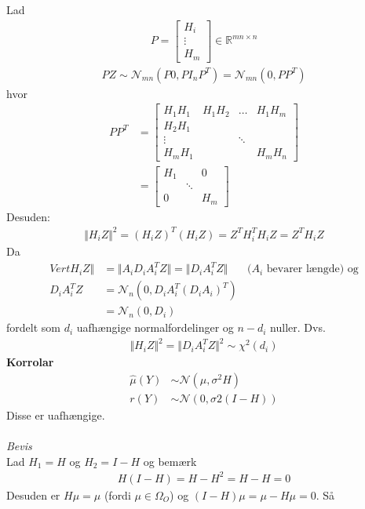 \documentclass[12pt,a4paper]{report}
\begin{document}
Lad
\begin{align*}
P=\begin{bmatrix}H_i\\ \vdots\\H_m\end{bmatrix}\in\mathbb{R}^{mn\times n}
\end{align*}
\begin{align*}
PZ\sim\mathcal{N}_{mn}(P0,PI_nP^T)=\mathcal{N}_{mn}(0,PP^T)
\end{align*}
hvor
\begin{align*}
PP^T&=\begin{bmatrix}H_1H_1&H_1H_2&\hdots&H_1H_m\\H_2H_1& & & \\
\vdots & &\ddots & \\
H_mH_1 & & &H_mH_n\end{bmatrix}\\
&=\begin{bmatrix}H_1& & 0\\&\ddots&\\0& & H_m\end{bmatrix}
\end{align*}
Desuden:
\begin{align*}
\Vert H_iZ\Vert^2=(H_iZ)^T(H_iZ)=Z^TH_i^TH_iZ=Z^TH_iZ
\end{align*}
Da
\begin{align*}
Vert H_iZ\Vert&=\Vert A_iD_iA_i^TZ\Vert=\Vert D_iA_i^TZ\Vert\phantom{mm}\text{($A_i$ bevarer længde) og}\\
D_iA_i^TZ&=\mathcal{N}_n(0,D_iA_i^T(D_iA_i)^T)\\
&=\mathcal{N}_n(0,D_i)
\end{align*}
fordelt som $d_i$ uafhængige normalfordelinger og $n-d_i$ nuller. Dvs.
\begin{align*}
\Vert H_iZ\Vert^2=\Vert D_iA_i^TZ\Vert^2\sim\chi^2(d_i)
\end{align*}
\textbf{Korrolar}
\begin{align*}
\hat{\mu}(Y)&\sim\mathcal{N}(\mu,\sigma^2H)\\
r(Y)&\sim\mathcal{N}(0,\sigma2(I-H))
\end{align*}
Disse er uafhængige.\\\\
\textit{Bevis}\\
Lad $H_1=H$ og $H_2=I-H$ og bemærk
\begin{align*}
H(I-H)=H-H^2=H-H=0
\end{align*}
Desuden er $H\mu=\mu$ (fordi $\mu\in\Omega_O$) og $(I-H)\mu=\mu-H\mu=0$. Så
\end{document}
